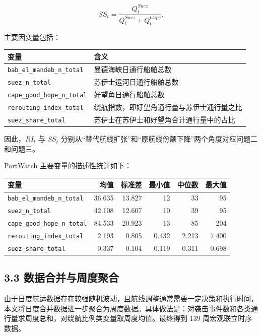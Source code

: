 \documentclass[
]{ctexart}
\begin{document}
\[
SS_t=\frac{Q^{Suez}_t}{Q^{Suez}_t+Q^{Cape}_t}.
\]

主要因变量包括：

\begin{longtable}[]{@{}ll@{}}
\toprule\noalign{}
变量 & 含义 \\
\midrule\noalign{}
\endhead
\bottomrule\noalign{}
\endlastfoot
\texttt{bab\_el\_mandeb\_n\_total} & 曼德海峡日通行船舶总数 \\
\texttt{suez\_n\_total} & 苏伊士运河日通行船舶总数 \\
\texttt{cape\_good\_hope\_n\_total} & 好望角日通行船舶总数 \\
\texttt{rerouting\_index\_total} & 绕航指数，即好望角通行量与苏伊士通行量之比 \\
\texttt{suez\_share\_total} &
苏伊士在苏伊士和好望角合计通行量中的占比 \\
\end{longtable}

因此，\(RI_t\) 与 \(SS_t\)
分别从``替代航线扩张''和``原航线份额下降''两个角度对应问题二和问题三。

PortWatch 主要变量的描述性统计如下：

\begin{longtable}[]{@{}lrrrrr@{}}
\toprule\noalign{}
变量 & 均值 & 标准差 & 最小值 & 中位数 & 最大值 \\
\midrule\noalign{}
\endhead
\bottomrule\noalign{}
\endlastfoot
\texttt{bab\_el\_mandeb\_n\_total} & 36.635 & 13.827 & 12 & 33 & 95 \\
\texttt{suez\_n\_total} & 42.108 & 12.607 & 10 & 39 & 95 \\
\texttt{cape\_good\_hope\_n\_total} & 84.533 & 20.923 & 13 & 85 & 204 \\
\texttt{rerouting\_index\_total} & 2.193 & 0.805 & 0.432 & 2.213 &
7.400 \\
\texttt{suez\_share\_total} & 0.337 & 0.104 & 0.119 & 0.311 & 0.698 \\
\end{longtable}

\subsection{3.3
数据合并与周度聚合}\label{ux6570ux636eux5408ux5e76ux4e0eux5468ux5ea6ux805aux5408}

由于日度航运数据存在较强随机波动，且航线调整通常需要一定决策和执行时间，本文将日度合并数据进一步聚合为周度数据。具体做法是：对袭击事件数和各类通行量求周度总和，对绕航比例类变量取周度均值。最终得到
139 周宏观联立时序数据。
\end{document}
